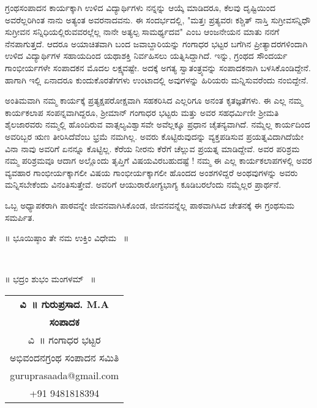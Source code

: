 {ಗ್ರಂಥಸಂಪಾದನ ಕಾರ್ಯಕ್ಕಾಗಿ ಉಳಿದ ವಿದ್ಯಾರ್ಥಿಗಳು ನನ್ನನ್ನು ಆಯ್ಕೆ \-ಮಾಡಿದರೂ, ಕೆಲವು ದೃಷ್ಟಿಯಿಂದ ಅವರೆಲ್ಲರಿಗಿಂತ ನಾನು ಅತ್ಯಂತ ಅವರನಾದವನು.  ಈ ಸಂದರ್ಭದಲ್ಲಿ, "ಮತ್ತಃ ಪ್ರತ್ಯವರಃ ಕಶ್ಚಿತ್ ನಾಸ್ತಿ ಸುಗ್ರೀವಸನ್ನಿಧೌ \enginline{-} ಸುಗ್ರೀವನ ಸನ್ನಿಧಿಯಲ್ಲಿರುವವರಲ್ಲೆಲ್ಲ ನಾನೇ ಅತ್ಯಲ್ಪ ಸಾಮರ್ಥ್ಯದವ" ಎಂಬ ಆಂಜನೇಯನ ಮಾತು ನನಗೆ ನೆನಪಾಗುತ್ತದೆ. ಆದರೂ ಅಯಾಚಿತವಾಗಿ ಬಂದ ಜವಾಬ್ದಾರಿಯನ್ನು ಗಂಗಾಧರ ಭಟ್ಟರ ಬಗೆಗಿನ ಪ್ರೀತ್ಯಾದರಗಳಿಂದಾಗಿ  ಉಳಿದ ವಿದ್ಯಾರ್ಥಿಗಳ ಸಹಾಯದಿಂದ ಯಥಾಶಕ್ತಿ ನಿರ್ವಹಿಸಲು ಯತ್ನಿಸಿದ್ದಾಗಿದೆ. ಇನ್ನು, ಗ್ರಂಥದ ಸೌಂದರ್ಯ \hbox{ಗಾಂಭೀರ್ಯಗಳೇ} ಸಂಪಾದಕನ ಮೊದಲ ಲಕ್ಷ್ಯವಷ್ಟೇ. ಅದಕ್ಕೆ ಅಗತ್ಯ ಸ್ವಾತಂತ್ರ್ಯವನ್ನು ಸಂಪಾದಕನಾಗಿ ಬಳಸಿಕೊಂಡಿದ್ದೇನೆ. ಹಾಗಾಗಿ ಇಲ್ಲಿ ಏನಾದರೂ ಕುಂದುಕೊರತೆಗಗಳು \hbox{ಉಂಟಾದಲ್ಲಿ} ಅವುಗಳನ್ನು ಹಿರಿಯರು \hbox{ಮನ್ನಿಸುವರೆಂದು} ನಂಬಿದ್ದೇನೆ.

ಅಂತಿಮವಾಗಿ \enginline{-} 
ನಮ್ಮ ಕಾರ್ಯಕ್ಕೆ ಪ್ರತ್ಯಕ್ಷ\enginline{-}ಪರೋಕ್ಷವಾಗಿ ಸಹಕರಿಸಿದ ಎಲ್ಲರಿಗೂ ಅನಂತ ಕೃತಜ್ಞತೆಗಳು. ಈ ಎಲ್ಲ ನಮ್ಮ ಕಾರ್ಯಕಲಾಪ ಸಂಪನ್ನವಾಗಿದ್ದರೂ, ಶ್ರೀಮಾನ್ ಗಂಗಾಧರ ಭಟ್ಟರು ಮತ್ತು ಅವರ ಸಹಧರ್ಮಿಣೀ ಶ್ರೀಮತಿ ಶೈಲಜಾರವರು ನಮ್ಮಲ್ಲಿ ಹೊಂದಿರುವ ವಾತ್ಸಲ್ಯ\enginline{-}ವಿಶ್ವಾಸವೇ ಅವೆಲ್ಲಕ್ಕೂ ಪ್ರಧಾನ ಚೈತನ್ಯವಾಗಿದೆ. ನಮ್ಮೆಲ್ಲ ಕಾರ್ಯದಿಂದ ಅವರಿಬ್ಬರ ಋಣ ತೀರಿಸಿದೆವೆಂಬ ಭ್ರಮೆ ನಮಗಿಲ್ಲ. ಅವರು ಕೊಟ್ಟಿರುವು\-ದನ್ನು ವ್ಯಕ್ತಪಡಿಸುವ ಪ್ರಯತ್ನವಿದಾಗಿದೆಯೇ ವಿನಾ ನಾವು ಅವರಿಗೆ ಏನನ್ನೂ \hbox{ಕೊಟ್ಟಿಲ್ಲ.} ಕೆರೆಯ ನೀರನು ಕೆರೆಗೆ ಚೆಲ್ಲುವ ಪ್ರಯತ್ನ ಮಾಡಿದ್ದೇವೆ. ಅವರ ಪರಿಶ್ರಮ ನಮ್ಮ ಪರಿಶ್ರಮವೂ ಆದಾಗ ಅಲ್ಲೊಂದು ತೃಪ್ತಿಗೆ ವಿಷಯವಿರಬಹುದಷ್ಟೆ ! ನಮ್ಮ  ಈ ಎಲ್ಲ ಕಾರ್ಯ\-ಕಲಾಪಗಳಲ್ಲಿ ಅವರ ವ್ಯವಹಾರ ಗಾಂಭೀರ್ಯಕ್ಕಾಗಲೀ ವಿಷಯ ಗಾಂಭೀರ್ಯಕ್ಕಾಗಲೀ ಹೊಂದದ ಅಂಶಗಳಿದ್ದರೆ ಅಂಥವುಗಳನ್ನು ಅವರು ಮನ್ನಿಸಬೇಕೆಂದು ವಿನಂತಿಸುತ್ತೇವೆ. ಅವರಿಗೆ ಆಯುರಾರೋಗ್ಯಭಾಗ್ಯ ಕೂಡಿಬರಲೆಂದು ನಮ್ಮೆಲ್ಲರ ಪ್ರಾರ್ಥನೆ. 

ಒಬ್ಬ ಅಧ್ಯಾಪಕರಾಗಿ ಪಾಠವನ್ನೇ ಜೀವನವಾಗಿಸಿಕೊಂಡ, ಜೀವನವನ್ನೆಲ್ಲ ಪಾಠವಾಗಿಸಿದ ಚೇತನಕ್ಕೆ ಈ ಗ್ರಂಥಸುಮ ಸಮರ್ಪಿತ.\\
\smallskip
\noindent
\centerline{॥ ಭೂಯಿಷ್ಠಾಂ ತೇ ನಮ ಉಕ್ತಿಂ ವಿಧೇಮ ~॥}\\
\centerline{ ॥ ಭದ್ರಂ ಶುಭಂ ಮಂಗಳಮ್ ~॥}

\medskip
\hfill\begin{tabular}{c}
\textbf{ವಿ~॥ ಗುರುಪ್ರಸಾದ. M.A}\\
\textbf{ಸಂಪಾದಕ}\\
{\small ವಿ~॥ ಗಂಗಾಧರ ಭಟ್ಟರ}\\
{\small ಅಭಿವಂದನಗ್ರಂಥ ಸಂಪಾದನ ಸಮಿತಿ}\\
guruprasaada@gmail.com\\
+91 9481818394%
\end{tabular}
\articleend
}

